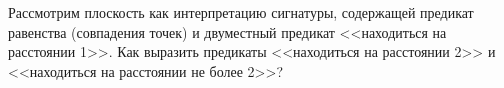 Рассмотрим плоскость как интерпретацию сигнатуры, содержащей предикат равенства (совпадения точек) и
двуместный предикат <<находиться на расстоянии 1>>. Как выразить предикаты <<находиться на расстоянии 2>>
и <<находиться на расстоянии не более 2>>?
